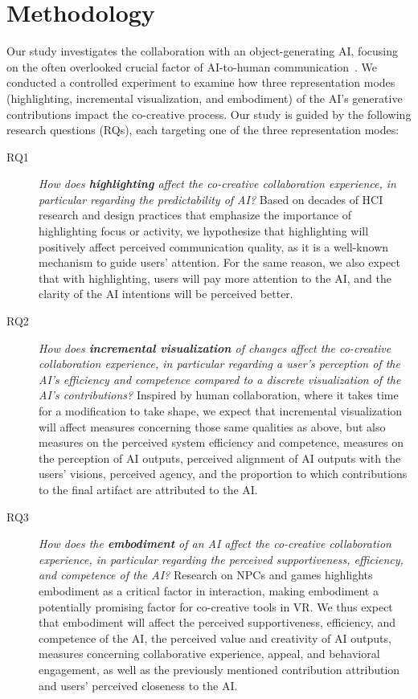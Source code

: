 \section{Methodology}

Our study investigates the collaboration with an object-generating AI, focusing on the often overlooked crucial factor of AI-to-human communication~\cite{rezwana_designing_2022}.
We conducted a controlled experiment to examine how three representation modes (highlighting, incremental visualization, and embodiment) of the AI's generative contributions impact the co-creative process.
Our study is guided by the following research questions (RQs), each targeting one of the three representation modes:


\begin{description}
\item[RQ1] \emph{How does \textbf{highlighting} affect the co-creative collaboration experience, in particular regarding the predictability of AI?}   
Based on decades of HCI research and design practices that emphasize the importance of highlighting focus or activity, we hypothesize that highlighting will positively affect perceived communication quality, as it is a well-known mechanism to guide users' attention. 
For the same reason, we also expect that with highlighting, users will pay more attention to the AI, and the clarity of the AI intentions will be perceived better.
	
\item[RQ2] \emph{How does \textbf{incremental visualization} of changes affect the co-creative collaboration experience, in particular regarding a user's perception of the AI's efficiency and competence compared to a discrete visualization of the AI's contributions?}
Inspired by human collaboration, where it takes time for a modification to take shape, we expect that incremental visualization will affect measures concerning those same qualities as above, but also measures on the perceived system efficiency and competence, measures on the perception of AI outputs, perceived alignment of AI outputs with the users' visions, perceived agency, and the proportion to which contributions to the final artifact are attributed to the AI.
 
\item[RQ3] \emph{How does the \textbf{embodiment} of an AI affect the co-creative collaboration experience, in particular regarding the perceived supportiveness, efficiency, and competence of the AI?} 
Research on NPCs and games highlights embodiment as a critical factor in interaction, making embodiment a potentially promising factor for co-creative tools in VR. We thus expect that embodiment will affect the perceived supportiveness, efficiency, and competence of the AI, the perceived value and creativity of AI outputs, measures concerning collaborative experience, appeal, and behavioral engagement, as well as the previously mentioned contribution attribution and users' perceived closeness to the AI.
\end{description}


